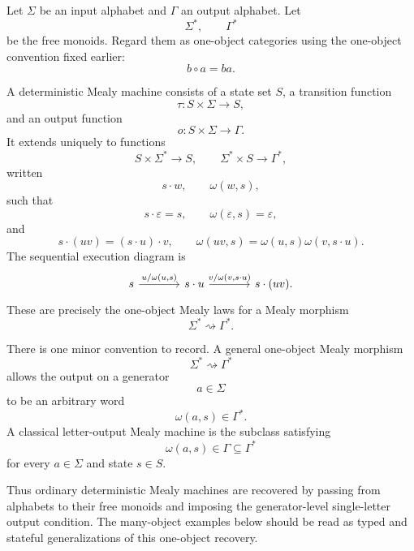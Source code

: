 \begin{example}
\label{example:classical-deterministic-mealy-machines}
    Let \(\Sigma\) be an input alphabet and \(\Gamma\) an output alphabet. Let
    \[
        \Sigma^\ast,
        \qquad
        \Gamma^\ast
    \]
    be the free monoids. Regard them as one-object categories using the one-object convention fixed earlier:
    \[
        b\circ a=ba.
    \]
    
    A deterministic Mealy machine consists of a state set \(S\), a transition function
    \[
        \tau:S\times\Sigma\to S,
    \]
    and an output function
    \[
        o:S\times\Sigma\to\Gamma.
    \]
    It extends uniquely to functions
    \[
        S\times\Sigma^\ast\to S,
        \qquad
        \Sigma^\ast\times S\to\Gamma^\ast,
    \]
    written
    \[
        s\cdot w,
        \qquad
        \omega(w,s),
    \]
    such that
    \[
        s\cdot\varepsilon=s,
        \qquad
        \omega(\varepsilon,s)=\varepsilon,
    \]
    and
    \[
        s\cdot(uv)=(s\cdot u)\cdot v,
        \qquad
        \omega(uv,s)=\omega(u,s)\omega(v,s\cdot u).
    \]
    The sequential execution diagram is
    \[
        \begin{tikzcd}[column sep=large]
                s
                    \arrow[r, "{u/\omega(u,s)}"]
            &
                s\cdot u
                    \arrow[r, "{v/\omega(v,s\cdot u)}"]
            &
                s\cdot(uv).
        \end{tikzcd}
    \]
    These are precisely the one-object Mealy laws for a Mealy morphism
    \[
        \Sigma^\ast\rightsquigarrow\Gamma^\ast.
    \]
    
    There is one minor convention to record. A general one-object Mealy morphism
    \[
        \Sigma^\ast\rightsquigarrow\Gamma^\ast
    \]
    allows the output on a generator
    \[
        a\in\Sigma
    \]
    to be an arbitrary word
    \[
        \omega(a,s)\in\Gamma^\ast.
    \]
    A classical letter-output Mealy machine is the subclass satisfying
    \[
        \omega(a,s)\in\Gamma\subseteq\Gamma^\ast
    \]
    for every \(a\in\Sigma\) and state \(s\in S\).
    
    Thus ordinary deterministic Mealy machines are recovered by passing from alphabets to their free monoids and imposing the generator-level single-letter output condition. The many-object examples below should be read as typed and stateful generalizations of this one-object recovery.
\end{example}

